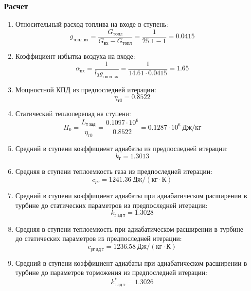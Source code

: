 \documentclass[a4paper,10pt]{article}
\begin{document}
    \subsubsection{Расчет}

    

    \begin{enumerate}

        \item Относительный расход топлива на входе в ступень:
        \[
            g_{топл.вх} = \frac{ G_{топл} }{ G_{вх} - G_{топл} } =
                \frac{ 1 }{ 25.1 - 1 } =
            0.0415
        \]

        \item Коэффициент избытка воздуха на входе:
        \[
            \alpha_{вх} = \frac{ 1 }{ l_0 g_{топл.вх} } =
                \frac{ 1 }{ 14.61 \cdot 0.0415 } =
            1.65
        \]

        \item Мощностной КПД из предпоследней итерации:
        \[
            \eta_{т0} = 0.8522
        \]

        \item Статический теплоперепад на ступени:
        \[
            H_0 = \frac{L_{т\ зад}}{\eta_{т0}} =
                \frac{ 0.1097 \cdot 10^6 }{ 0.8522 } =
            0.1287 \cdot 10^6 \ Дж/кг
        \]

        \item Средний в ступени коэффициент адиабаты из предпоследней итерации:
        \[
            k_г = 1.3013
        \]

        \item Средняя в ступени теплоемкость газа из предпоследней итерации:
        \[
            c_{pг} = 1241.36 \ Дж/(кг \cdot К)
        \]

        \item Средний в ступени коэффициент адиабаты при адиабатическом расширении в турбине до статических параметров из предпоследней итерации:
        \[
            k_{г\ ад\ т} = 1.3028
        \]

        \item Средняя в ступени теплоемкость при адиабатическом расширении в турбине до статических параметров из предпоследней итерации:
        \[
            c_{pг\ ад\ т} = 1236.58 \ Дж/(кг \cdot К)
        \]

        \item Средний в ступени коэффициент адиабаты при адиабатическом расширении в турбине до параметров торможения из предпоследней итерации:
        \[
            k_{г\ ад\ т}^* = 1.3026
        \]


\end{enumerate}
\end{document}
